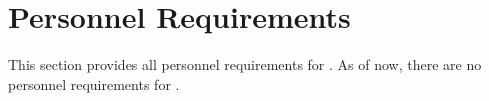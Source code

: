 \KNEADSECTIONNEWPAGE
\section{Personnel Requirements}
\label{lab:sec_Personnel}
% 

This section provides all personnel requirements for \ThisSys. As of now, there are no personnel requirements for \ThisSys.

